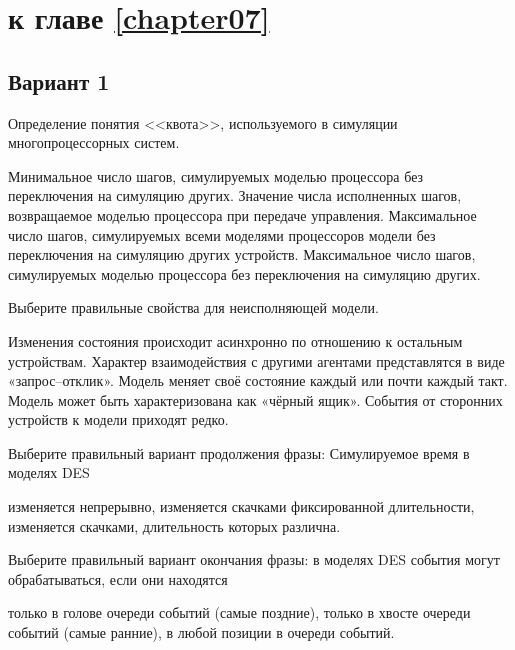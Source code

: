 \section{\Questions к главе \ref{chapter07}} %

\subsection*{Вариант 1}

\begin{questions}

\question[3] Определение понятия <<квота>>, используемого в симуляции многопроцессорных систем.
\begin{choices}
    \choice Минимальное число шагов, симулируемых моделью процессора без переключения на симуляцию других.
    \choice Значение числа исполненных шагов, возвращаемое моделью процессора при передаче управления.
    \choice Максимальное число шагов, симулируемых всеми моделями процессоров модели без переключения на симуляцию других устройств.
    \correctchoice Максимальное число шагов, симулируемых моделью процессора без переключения на симуляцию других.
\end{choices}


\question[3] Выберите правильные свойства для неисполняющей модели.
\begin{choices}
    \correctchoice Изменения состояния происходит асинхронно по отношению к остальным устройствам.
    \correctchoice Характер взаимодействия с другими агентами представлятся в виде «запрос--отклик».
    \choice Модель меняет своё состояние каждый или почти каждый такт.
    \correctchoice Модель может быть характеризована как «чёрный ящик».
    \choice События от сторонних устройств к модели приходят редко.
\end{choices}

\question[3] Выберите правильный вариант продолжения фразы: Симулируемое время в моделях DES 
\begin{choices}
    \choice изменяется непрерывно,
    \choice изменяется скачками фиксированной длительности,
    \correctchoice изменяется скачками, длительность которых различна.
\end{choices}
    
\question[3] Выберите правильный вариант окончания фразы: в моделях DES события могут обрабатываться, если они находятся
\begin{choices}
    \choice только в голове очереди событий (самые поздние),
    \correctchoice только в хвосте очереди событий (самые ранние),
    \choice в любой позиции в очереди событий.
\end{choices}


\end{questions}

